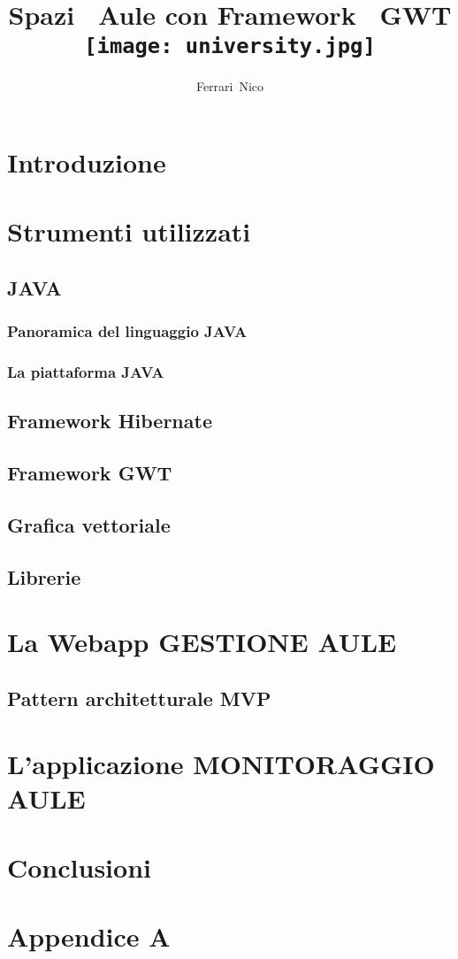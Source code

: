 \documentclass[a4paper,pt11,oneside]{book}
\title{
\huge
\textbf{Spazi ~Aule con Framework ~GWT}\\
{\texttt{[image: university.jpg]}}}
\author{Ferrari~Nico}
\begin{document}
\maketitle
\renewcommand{\contentsname}{Indice}
\tableofcontents
\listoffigures
\listoftables

\chapter{Introduzione}


\chapter{Strumenti utilizzati}
\section{JAVA}

\subsection{Panoramica del linguaggio JAVA}

\subsection{La piattaforma JAVA}

\section{Framework Hibernate}

\section{Framework GWT}

\section{Grafica vettoriale}

\section{Librerie}


\chapter{La Webapp GESTIONE AULE}

\section{Pattern architetturale MVP}

\chapter{L'applicazione MONITORAGGIO AULE}



\chapter{Conclusioni}

\chapter{Appendice A}


\end{document}
